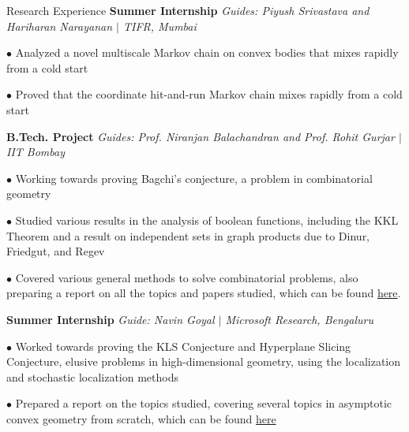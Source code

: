 
\begin{rubric}{Research Experience}
    \entry*[2022] \textbf{Summer Internship} \hfill \emph{Guides: Piyush Srivastava and Hariharan Narayanan $\mid$ TIFR, Mumbai}

        $\bullet$ Analyzed a novel multiscale Markov chain on convex bodies that mixes rapidly from a cold start

        $\bullet$ Proved that the coordinate hit-and-run Markov chain mixes rapidly from a cold start


    \entry*[\phantom{.}2022] \textbf{B.Tech. Project} \hfill \emph{Guides: Prof. Niranjan Balachandran and Prof. Rohit Gurjar $\mid$ IIT Bombay}

        $\bullet$ Working towards proving Bagchi's conjecture, a problem in combinatorial geometry

        $\bullet$ Studied various results in the analysis of boolean functions, including the KKL Theorem and a result on independent sets in graph products due to Dinur, Friedgut, and Regev

        $\bullet$ Covered various general methods to solve combinatorial problems, also preparing a report on all the topics and papers studied, which can be found \href{https://amitrajaraman.github.io/research/pls/btp1-report.pdf}{here}.
    
    \entry*[2021] \textbf{Summer Internship} \hfill \emph{Guide: Navin Goyal $\mid$ Microsoft Research, Bengaluru}
        
        $\bullet$ Worked towards proving the KLS Conjecture and Hyperplane Slicing Conjecture, elusive problems in high-dimensional geometry, using the localization and stochastic localization methods

        $\bullet$ Prepared a report on the topics studied, covering several topics in asymptotic convex geometry from scratch, which can be found \href{https://amitrajaraman.github.io/notes/convex-geometry/main.pdf}{here}

\end{rubric}
